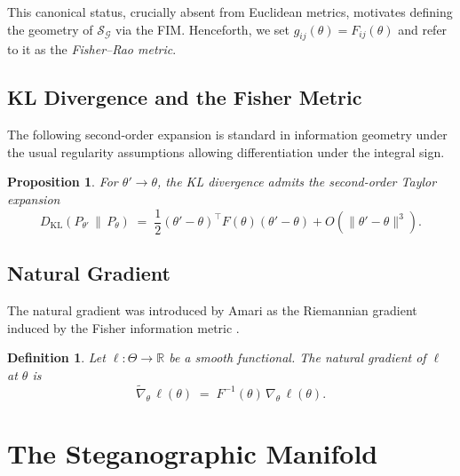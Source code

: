 \documentclass[a4paper,fleqn]{cas-dc}
\newtheorem{proposition}{Proposition}
\newtheorem{definition}{Definition}
\newcommand{\R}{\mathbb{R}}
\newcommand{\calS}{\mathcal{S}}
\newcommand{\calG}{\mathcal{G}}
\newcommand{\DKL}{D_{\mathrm{KL}}}
\newcommand{\natgrad}{\widetilde{\nabla}}
\begin{document}
This canonical status, crucially absent from Euclidean metrics, motivates
defining the geometry of $\calS_{\calG}$ via the FIM.
Henceforth, we set $g_{ij}(\theta) = F_{ij}(\theta)$ and refer to it as the
\emph{Fisher--Rao metric}.

\subsection{KL Divergence and the Fisher Metric}

The following second-order expansion is standard in information geometry
under the usual regularity assumptions allowing differentiation under the
integral sign.

\begin{proposition}%
  \label{prop:kl_taylor}
  For $\theta'\to\theta$, the KL divergence admits the second-order Taylor
  expansion
  \begin{equation}
    \DKL\!\left(P_{\theta'}\,\|\,P_\theta\right)
    \;=\; \frac{1}{2}(\theta'-\theta)^\top F(\theta)(\theta'-\theta)
          + O(\|\theta'-\theta\|^3).
    \label{eq:kl_taylor}
  \end{equation}
\end{proposition}

\subsection{Natural Gradient}

The natural gradient was introduced by Amari as the Riemannian gradient induced
by the Fisher information metric \cite{amari1998natural}.

\begin{definition}%
  \label{def:natural_gradient}
  Let $\ell:\Theta\to\R$ be a smooth functional.
  The \emph{natural gradient} of $\ell$ at $\theta$ is
  \begin{equation}
    \natgrad_\theta\,\ell(\theta)
    \;=\; F^{-1}(\theta)\,\nabla_\theta\,\ell(\theta).
    \label{eq:natural_gradient}
  \end{equation}
\end{definition}
\section{The Steganographic Manifold}
\label{sec:manifold}
\end{document}
